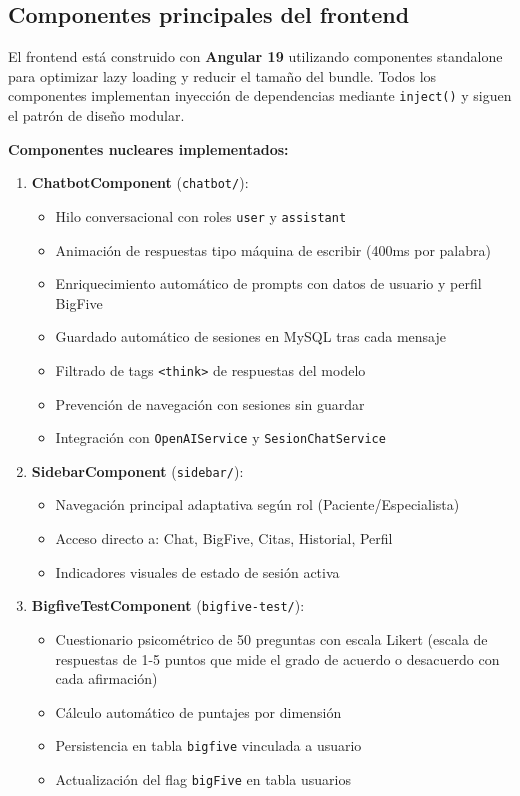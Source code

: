 \documentclass[12pt,a4paper]{report}
\numberwithin{figure}{section}
\begin{document}
\subsection{Componentes principales del frontend}
\label{subsec:frontend_componentes}

El frontend está construido con \textbf{Angular 19} utilizando componentes standalone para optimizar lazy loading y reducir el tamaño del bundle. Todos los componentes implementan inyección de dependencias mediante \texttt{inject()} y siguen el patrón de diseño modular.

\textbf{Componentes nucleares implementados:}

\begin{enumerate}
  \item \textbf{ChatbotComponent} (\texttt{chatbot/}):
  \begin{itemize}
    \item Hilo conversacional con roles \texttt{user} y \texttt{assistant}
    \item Animación de respuestas tipo máquina de escribir (400ms por palabra)
    \item Enriquecimiento automático de prompts con datos de usuario y perfil BigFive
    \item Guardado automático de sesiones en MySQL tras cada mensaje
    \item Filtrado de tags \texttt{<think>} de respuestas del modelo
    \item Prevención de navegación con sesiones sin guardar
    \item Integración con \texttt{OpenAIService} y \texttt{SesionChatService}
  \end{itemize}
  
  \item \textbf{SidebarComponent} (\texttt{sidebar/}):
  \begin{itemize}
    \item Navegación principal adaptativa según rol (Paciente/Especialista)
    \item Acceso directo a: Chat, BigFive, Citas, Historial, Perfil
    \item Indicadores visuales de estado de sesión activa
  \end{itemize}
  
  \item \textbf{BigfiveTestComponent} (\texttt{bigfive-test/}):
  \begin{itemize}
    \item Cuestionario psicométrico de 50 preguntas con escala Likert (escala de respuestas de 1-5 puntos que mide el grado de acuerdo o desacuerdo con cada afirmación)
    \item Cálculo automático de puntajes por dimensión
    \item Persistencia en tabla \texttt{bigfive} vinculada a usuario
    \item Actualización del flag \texttt{bigFive} en tabla usuarios
  \end{itemize}
  

\end{enumerate}
\end{document}
